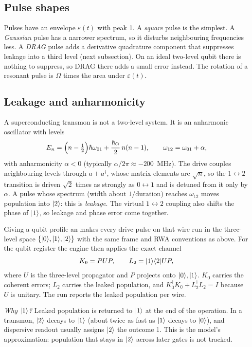 \subsection{Pulse shapes}

Pulses have an envelope $\varepsilon(t)$ with peak 1. A \emph{square} pulse is
the simplest. A \emph{Gaussian} pulse has a narrower spectrum, so it disturbs
neighbouring frequencies less. A \emph{DRAG} pulse adds a derivative
quadrature component that suppresses leakage into a third level (next
subsection). On an ideal two-level qubit there is nothing to suppress, so DRAG
there adds a small error instead. The rotation of a resonant pulse is $\Omega$
times the area under $\varepsilon(t)$.

\subsection{Leakage and anharmonicity}

A superconducting transmon is not a two-level system. It is an anharmonic
oscillator with levels
\[
E_n=\Bigl(n-\tfrac12\Bigr)\hbar\omega_{01}+\frac{\hbar\alpha}{2}\,n(n-1),
\qquad \omega_{12}=\omega_{01}+\alpha,
\]
with anharmonicity $\alpha<0$ (typically $\alpha/2\pi\approx-200$~MHz). The
drive couples neighbouring levels through $a+a^\dagger$, whose matrix elements
are $\sqrt n$, so the $1\leftrightarrow2$ transition is driven $\sqrt2$ times as
strongly as $0\leftrightarrow1$ and is detuned from it only by $\alpha$. A pulse
whose spectrum (width about $1/\text{duration}$) reaches $\omega_{12}$ moves
population into $\lvert 2\rangle$: this is \emph{leakage}. The virtual $1\leftrightarrow2$
coupling also shifts the phase of $\lvert 1\rangle$, so leakage and phase error come
together.

Giving a qubit profile an  makes every drive pulse on that
wire run in the three-level space $\{\lvert 0\rangle,\lvert 1\rangle,\lvert 2\rangle\}$ with the same frame
and RWA conventions as above. For the qubit register the engine then applies
the exact channel
\[
K_0=PUP,\qquad L_2=\lvert 1\rangle\langle 2\rvert UP,
\]
where $U$ is the three-level propagator and $P$ projects onto
$\lvert 0\rangle,\lvert 1\rangle$. $K_0$ carries the coherent errors; $L_2$ carries the leaked
population, and $K_0^\dagger K_0+L_2^\dagger L_2=I$ because $U$ is unitary.
The run reports the leaked population per wire.

\emph{Why $\lvert 1\rangle$?} Leaked population is returned to $\lvert 1\rangle$ at the end of the
operation. In a transmon, $\lvert 2\rangle$ decays to $\lvert 1\rangle$ (about twice as fast as
$\lvert 1\rangle$ decays to $\lvert 0\rangle$), and dispersive readout usually assigns $\lvert 2\rangle$ the
outcome 1. This is the model's approximation: population that stays in $\lvert 2\rangle$
across later gates is not tracked.

